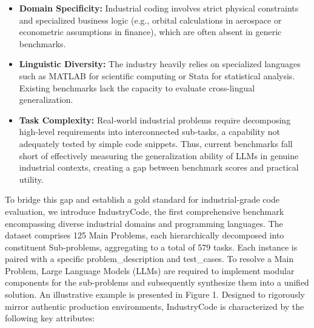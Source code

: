 \documentclass{article}
\theoremstyle{plain}
\theoremstyle{definition}
\theoremstyle{remark}
\begin{document}
\begin{itemize}
  \vspace{-0.1cm}
  \item \textbf{Domain Specificity:} Industrial coding involves strict physical constraints and specialized business logic (e.g., orbital calculations in aerospace or econometric assumptions in finance), which are often absent in generic benchmarks.~\cite{ishida2024langprop, rink2018cfdlang, pandey2025openfoamgpt, haag2025training,song2025code,he2025using}
  \vspace{-0.1cm}
  \item \textbf{Linguistic Diversity:} The industry heavily relies on specialized languages such as MATLAB for scientific computing or Stata for statistical analysis. Existing benchmarks lack the capacity to evaluate cross-lingual generalization.~\cite{articlematlab,o2025industry}
  \vspace{-0.1cm}
  \item \textbf{Task Complexity:} Real-world industrial problems require decomposing high-level requirements into interconnected sub-tasks, a capability not adequately tested by simple code snippets. Thus, current benchmarks fall short of effectively measuring the generalization ability of LLMs in genuine industrial contexts, creating a gap between benchmark scores and practical utility.
\end{itemize}



To bridge this gap and establish a gold standard for industrial-grade code evaluation, we introduce IndustryCode, the first comprehensive benchmark encompassing diverse industrial domains and programming languages. The dataset comprises 125 Main Problems, each hierarchically decomposed into constituent Sub-problems, aggregating to a total of 579 tasks. Each instance is paired with a specific problem\_description and test\_cases. To resolve a Main Problem, Large Language Models (LLMs) are required to implement modular components for the sub-problems and subsequently synthesize them into a unified solution. An illustrative example is presented in Figure 1. Designed to rigorously mirror authentic production environments, IndustryCode is characterized by the following key attributes:
\end{document}
